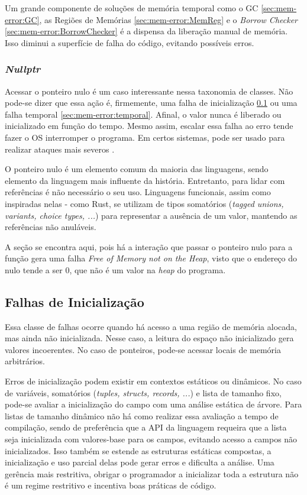 Um grande componente de soluções de memória temporal como o GC \ref{sec:mem-error:GC}, as Regiões de Memórias \ref{sec:mem-error:MemReg} e o \emph{Borrow Checker} \ref{sec:mem-error:BorrowChecker} é a dispensa da liberação manual de memória. Isso diminui a superfície de falha do código, evitando possíveis erros.

\subsubsection{\emph{Nullptr}}
\label{sec:mem-error:temporal:null}

Acessar o ponteiro nulo é um caso interessante nessa taxonomia de classes. Não pode-se dizer que essa ação é, firmemente, uma falha de inicialização \ref{sec:mem-error:init} ou uma falha temporal \ref{sec:mem-error:temporal}. Afinal, o valor nunca é liberado ou inicializado em função do tempo. Mesmo assim, escalar essa falha ao erro tende fazer o OS interromper o programa. Em certos sistemas, pode ser usado para realizar ataques mais severos \cite[p.4]{MemErrorPastPresentFuture}.

O ponteiro nulo é um elemento comum da maioria das linguagens, sendo elemento da linguagem mais influente da história. Entretanto, para lidar com referências é não necessário o seu uso. Linguagens funcionais, assim como inspiradas nelas - como Rust, se utilizam de tipos somatórios (\emph{tagged unions, variants, choice types, ...}) para representar a ausência de um valor, mantendo as referências não anuláveis.

A seção se encontra aqui, pois há a interação que passar o ponteiro nulo para a função \FREE gera uma falha \emph{Free of Memory not on the Heap}, visto que o endereço do nulo tende a ser 0, que não é um valor na \emph{heap} do programa.


\subsection{Falhas de Inicialização}
\label{sec:mem-error:init}

Essa classe de falhas ocorre quando há acesso a uma região de memória alocada, mas ainda não inicializada. Nesse caso, a leitura do espaço não inicializado gera valores incoerentes. No caso de ponteiros, pode-se acessar locais de memória arbitrários.

Erros de inicialização podem existir em contextos estáticos ou dinâmicos. No caso de variáveis, somatórios (\emph{tuples, structs, records, ...}) e lista de tamanho fixo, pode-se avaliar a inicialização do campo com uma análise estática de árvore. Para listas de tamanho dinâmico não há como realizar essa avaliação a tempo de compilação, sendo de preferência que a API da linguagem requeira que a lista seja inicializada com valores-base para os campos, evitando acesso a campos não inicializados. Isso também se estende as estruturas estáticas compostas, a inicialização e uso parcial delas pode gerar erros e dificulta a análise. Uma gerência mais restritiva, obrigar o programador a inicializar toda a estrutura não é um regime restritivo e incentiva boas práticas de código.

